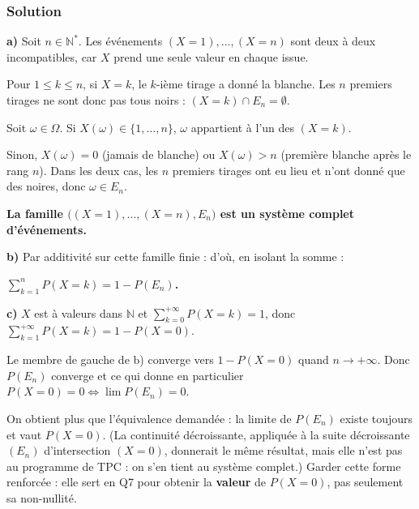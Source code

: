 \documentclass[11pt,a4paper]{article}
\providecommand{\varnothing}{\emptyset}
\newcommand{\equationajustee}[1]{%
  \sbox{\boiteequation}{$\displaystyle #1$}%
  \ifdim\wd\boiteequation>\linewidth
    \[\resizebox{\linewidth}{!}{\usebox{\boiteequation}}\]%
  \else
    \[#1\]%
  \fi}
\begin{document}
\hypertarget{solution}{%
\subsubsection{Solution}\label{solution}}

\textbf{a)} Soit \(n\in\mathbb N^*\). Les événements \((X=1),\dots,(X=n)\) sont deux à deux incompatibles, car \(X\) prend une seule valeur en chaque issue.

Pour \(1\le k\le n\), si \(X=k\), le \(k\)-ième tirage a donné la blanche. Les \(n\) premiers tirages ne sont donc pas tous noirs : \((X=k)\cap E_n=\varnothing\).

Soit \(\omega\in\Omega\). Si \(X(\omega)\in\{1,\dots,n\}\), \(\omega\) appartient à l'un des \((X=k)\).

Sinon, \(X(\omega)=0\) (jamais de blanche) ou \(X(\omega)>n\) (première blanche après le rang \(n\)). Dans les deux cas, les \(n\) premiers tirages ont eu lieu et n'ont donné que des noires, donc \(\omega\in E_n\).

\textbf{La famille \(\big((X=1),\dots,(X=n),E_n\big)\) est un système complet d'événements.}

\textbf{b)} Par additivité sur cette famille finie :
\equationajustee{\begin{aligned}
1&=P(\Omega)\\
&=\sum_{k=1}^{n}P(X=k)+P(E_n),
\end{aligned}}
d'où, en isolant la somme :

\textbf{\(\displaystyle\sum_{k=1}^{n}P(X=k)=1-P(E_n)\).}

\textbf{c)} \(X\) est à valeurs dans \(\mathbb N\) et \(\sum_{k=0}^{+\infty}P(X=k)=1\), donc \(\sum_{k=1}^{+\infty}P(X=k)=1-P(X=0)\).

Le membre de gauche de b) converge vers \(1-P(X=0)\) quand \(n\to+\infty\). Donc \(P(E_n)\) converge et
\equationajustee{\boxed{\lim_{n\to+\infty}P(E_n)=P(X=0)},}
ce qui donne en particulier \(P(X=0)=0\iff\lim P(E_n)=0\).

\begin{methode}

On obtient plus que l'équivalence demandée : la limite de \(P(E_n)\) existe toujours et vaut \(P(X=0)\). (La continuité décroissante, appliquée à la suite décroissante \((E_n)\) d'intersection \((X=0)\), donnerait le même résultat, mais elle n'est pas au programme de TPC : on s'en tient au système complet.) Garder cette forme renforcée : elle sert en Q7 pour obtenir la \textbf{valeur} de \(P(X=0)\), pas seulement sa non-nullité.

\end{methode}
\end{document}
